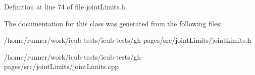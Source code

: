 Definition at line 74 of file joint\+Limits.\+h.



The documentation for this class was generated from the following files\+:\begin{DoxyCompactItemize}
\item 
/home/runner/work/icub-\/tests/icub-\/tests/gh-\/pages/src/joint\+Limits/joint\+Limits.\+h\item 
/home/runner/work/icub-\/tests/icub-\/tests/gh-\/pages/src/joint\+Limits/joint\+Limits.\+cpp\end{DoxyCompactItemize}
